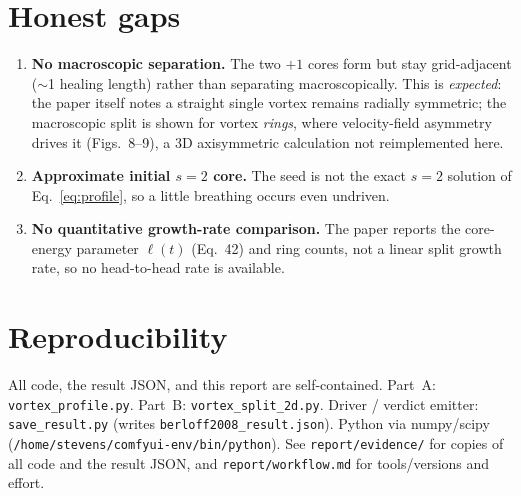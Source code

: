 \documentclass[11pt]{article}
\begin{document}
\section{Honest gaps}
\begin{enumerate}
  \item \textbf{No macroscopic separation.} The two $+1$ cores form but stay
        grid-adjacent ($\sim$1 healing length) rather than separating
        macroscopically. This is \emph{expected}: the paper itself notes a
        straight single vortex remains radially symmetric; the macroscopic split
        is shown for vortex \emph{rings}, where velocity-field asymmetry drives
        it (Figs.~8--9), a 3D axisymmetric calculation not reimplemented here.
  \item \textbf{Approximate initial $s=2$ core.} The seed is not the exact $s=2$
        solution of Eq.~\eqref{eq:profile}, so a little breathing occurs even
        undriven.
  \item \textbf{No quantitative growth-rate comparison.} The paper reports the
        core-energy parameter $\ell(t)$ (Eq.~42) and ring counts, not a linear
        split growth rate, so no head-to-head rate is available.
\end{enumerate}

\section{Reproducibility}
All code, the result JSON, and this report are self-contained. Part~A:
\texttt{vortex\_profile.py}. Part~B: \texttt{vortex\_split\_2d.py}. Driver /
verdict emitter: \texttt{save\_result.py} (writes
\texttt{berloff2008\_result.json}). Python via numpy/scipy
(\texttt{/home/stevens/comfyui-env/bin/python}). See
\texttt{report/evidence/} for copies of all code and the result JSON, and
\texttt{report/workflow.md} for tools/versions and effort.
\end{document}
